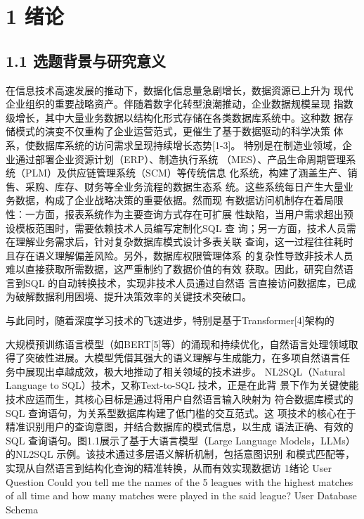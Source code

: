 \documentclass[12pt,a4paper,openright,UTF8]{ctexbook}
\begin{document}
\chapter{1 绪论}

\section{1.1 选题背景与研究意义}

在信息技术高速发展的推动下，数据化信息量急剧增长，数据资源已上升为 现代企业组织的重要战略资产。伴随着数字化转型浪潮推动，企业数据规模呈现 指数级增长，其中大量业务数据以结构化形式存储在各类数据库系统中。这种数 据存储模式的演变不仅重构了企业运营范式，更催生了基于数据驱动的科学决策 体系，使数据库系统的访问需求呈现持续增长态势[1-3]。 特别是在制造业领域，企业通过部署企业资源计划（ERP）、制造执行系统 （MES）、产品生命周期管理系统（PLM）及供应链管理系统（SCM）等传统信息 化系统，构建了涵盖生产、销售、采购、库存、财务等全业务流程的数据生态系 统。这些系统每日产生大量业务数据，构成了企业战略决策的重要依据。然而现 有数据访问机制存在着局限性：一方面，报表系统作为主要查询方式存在可扩展 性缺陷，当用户需求超出预设模板范围时，需要依赖技术人员编写定制化SQL 查 询；另一方面，技术人员需在理解业务需求后，针对复杂数据库模式设计多表关联 查询，这一过程往往耗时且存在语义理解偏差风险。另外，数据库权限管理体系 的复杂性导致非技术人员难以直接获取所需数据，这严重制约了数据价值的有效 获取。因此，研究自然语言到SQL 的自动转换技术，实现非技术人员通过自然语 言直接访问数据库，已成为破解数据利用困境、提升决策效率的关键技术突破口。

与此同时，随着深度学习技术的飞速进步，特别是基于Transformer[4]架构的

大规模预训练语言模型（如BERT[5]等）的涌现和持续优化，自然语言处理领域取 得了突破性进展。大模型凭借其强大的语义理解与生成能力，在多项自然语言任 务中展现出卓越成效，极大地推动了相关领域的技术进步。 NL2SQL（Natural Language to SQL）技术，又称Text-to-SQL 技术，正是在此背 景下作为关键使能技术应运而生，其核心目标是通过将用户自然语言输入映射为 符合数据库模式的SQL 查询语句，为关系型数据库构建了低门槛的交互范式。这 项技术的核心在于精准识别用户的查询意图，并结合数据库的模式信息，以生成 语法正确、有效的SQL 查询语句。图1.1展示了基于大语言模型（Large Language Models，LLMs）的NL2SQL 示例。该技术通过多层语义解析机制，包括意图识别 和模式匹配等，实现从自然语言到结构化查询的精准转换，从而有效实现数据访 1绪论 User Question Could you tell me the names of the 5 leagues with the highest matches of all time and how many matches were played in the said league? User Database Schema
\end{document}
